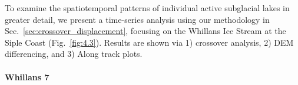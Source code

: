 To examine the spatiotemporal patterns of individual active subglacial lakes in greater detail, we present a time-series analysis using our methodology in Sec.~\ref{sec:crossover_displacement}, focusing on the Whillans Ice Stream at the Siple Coast (Fig.~\ref{fig:4.3}).
Results are shown via 1) crossover analysis, 2) \gls{DEM} differencing, and 3) Along track plots.







\paragraph{Whillans 7} \label{sec:whillans_7}

